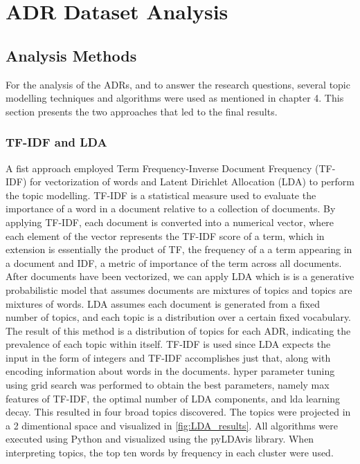 \chapter{ADR Dataset Analysis}
    \section{Analysis Methods}
        For the analysis of the ADRs, and to answer the research questions, several topic modelling techniques and algorithms were used as mentioned in chapter 4. This section presents the two approaches that led to the final results.
        \subsection{TF-IDF and LDA} 
        A fist approach employed Term Frequency-Inverse Document Frequency (TF-IDF) for vectorization of words and Latent Dirichlet Allocation (LDA) to perform the topic modelling. TF-IDF is a statistical measure used to evaluate the importance of a word in a document relative to a collection of documents. By applying TF-IDF, each document is converted into a numerical vector, where each element of the vector represents the TF-IDF score of a term, which in extension is essentially the product of TF, the frequency of a a term appearing in a document and IDF, a metric of importance of the term across all documents. After documents have been vectorized, we can apply LDA which is is a generative probabilistic model that assumes documents are mixtures of topics and topics are mixtures of words\cite{LDA_paper}. LDA assumes each document is generated from a fixed number of topics, and each topic is a distribution over a certain fixed vocabulary. The result of this method is a distribution of topics for each ADR, indicating the prevalence of each topic within itself. TF-IDF is used since LDA expects the input in the form of integers and TF-IDF accomplishes just that, along with encoding information about words in the documents. hyper parameter tuning using grid search was performed to obtain the best parameters, namely max features of TF-IDF, the optimal number of LDA components, and lda learning decay. This resulted in four broad topics discovered. The topics were projected in a 2 dimentional space and visualized in \ref{fig:LDA_results}. All algorithms were executed using Python and visualized using the pyLDAvis library. When interpreting topics, the top ten words by frequency in each cluster were used.

